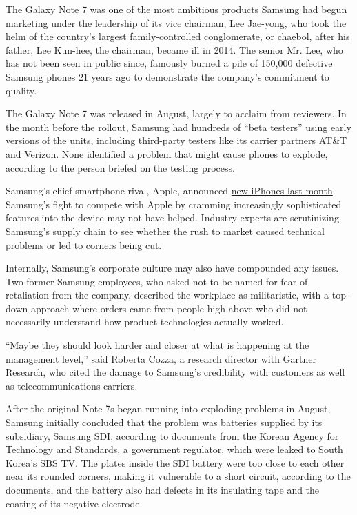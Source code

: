 The Galaxy Note 7 was one of the most ambitious products Samsung had
begun marketing under the leadership of its vice chairman, Lee Jae-yong,
who took the helm of the country's largest family-controlled
conglomerate, or chaebol, after his father, Lee Kun-hee, the chairman,
became ill in 2014. The senior Mr. Lee, who has not been seen in public
since, famously burned a pile of 150,000 defective Samsung phones 21
years ago to demonstrate the company's commitment to quality.

The Galaxy Note 7 was released in August, largely to acclaim from
reviewers. In the month before the rollout, Samsung had hundreds of
``beta testers'' using early versions of the units, including
third-party testers like its carrier partners AT\&T and Verizon. None
identified a problem that might cause phones to explode, according to
the person briefed on the testing process.

Samsung's chief smartphone rival, Apple, announced
\href{http://www.nytimes.com/2016/09/08/technology/iphone-7-apple-headphone-jack.html}{new
iPhones last month}. Samsung's fight to compete with Apple by cramming
increasingly sophisticated features into the device may not have helped.
Industry experts are scrutinizing Samsung's supply chain to see whether
the rush to market caused technical problems or led to corners being
cut.

Internally, Samsung's corporate culture may also have compounded any
issues. Two former Samsung employees, who asked not to be named for fear
of retaliation from the company, described the workplace as
militaristic, with a top-down approach where orders came from people
high above who did not necessarily understand how product technologies
actually worked.

``Maybe they should look harder and closer at what is happening at the
management level,'' said Roberta Cozza, a research director with Gartner
Research, who cited the damage to Samsung's credibility with customers
as well as telecommunications carriers.

After the original Note 7s began running into exploding problems in
August, Samsung initially concluded that the problem was batteries
supplied by its subsidiary, Samsung SDI, according to documents from the
Korean Agency for Technology and Standards, a government regulator,
which were leaked to South Korea's SBS TV. The plates inside the SDI
battery were too close to each other near its rounded corners, making it
vulnerable to a short circuit, according to the documents, and the
battery also had defects in its insulating tape and the coating of its
negative electrode.

